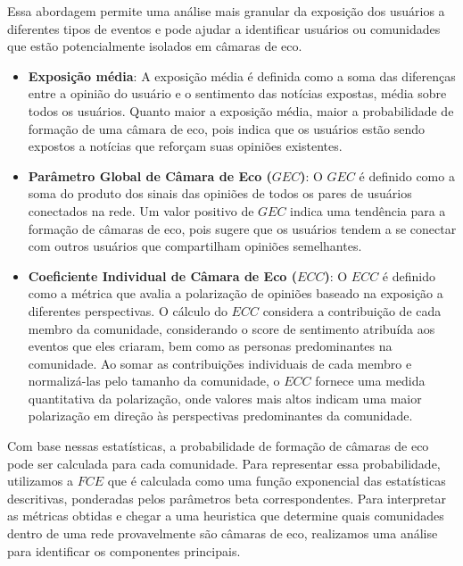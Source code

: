 Essa abordagem permite uma análise mais granular da exposição dos usuários a diferentes tipos de eventos e pode ajudar a identificar usuários ou comunidades que estão potencialmente isolados em câmaras de eco.

\begin{itemize}
	\item \textbf{Exposição média}: A exposição média é definida como a soma das diferenças entre a opinião do usuário e o sentimento das notícias expostas, média sobre todos os usuários. Quanto maior a exposição média, maior a probabilidade de formação de uma câmara de eco, pois indica que os usuários estão sendo expostos a notícias que reforçam suas opiniões existentes.
	\item \textbf{Parâmetro Global de Câmara de Eco ($GEC$)}: O $GEC$ é definido como a soma do produto dos sinais das opiniões de todos os pares de usuários conectados na rede. Um valor positivo de $GEC$ indica uma tendência para a formação de câmaras de eco, pois sugere que os usuários tendem a se conectar com outros usuários que compartilham opiniões semelhantes.
	\item \textbf{Coeficiente Individual de Câmara de Eco ($ECC$)}: O $ECC$ é definido como a métrica que avalia a polarização de opiniões baseado na exposição a diferentes perspectivas. O cálculo do $ECC$ considera a contribuição de cada membro da comunidade, considerando o score de sentimento atribuída aos eventos que eles criaram, bem como as personas predominantes na comunidade. Ao somar as contribuições individuais de cada membro e normalizá-las pelo tamanho da comunidade, o $ECC$ fornece uma medida quantitativa da polarização, onde valores mais altos indicam uma maior polarização em direção às perspectivas predominantes da comunidade.
\end{itemize}

Com base nessas estatísticas, a probabilidade de formação de câmaras de eco pode ser calculada para cada comunidade. Para representar essa probabilidade, utilizamos a $FCE$ que é calculada como uma função exponencial das estatísticas descritivas, ponderadas pelos parâmetros beta correspondentes. Para interpretar as métricas obtidas e chegar a uma heuristica que determine quais comunidades dentro de uma rede provavelmente são câmaras de eco, realizamos uma análise para identificar os componentes principais.

